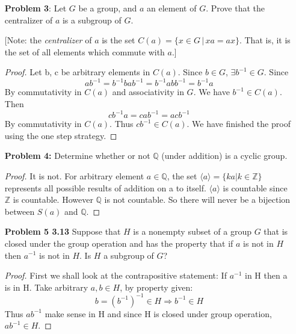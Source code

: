 \documentclass[11pt, oneside]{article}
\newcommand{\Z}{\mathbb Z}
\newcommand{\Q}{\mathbb Q}
\begin{document}
\begin{enumerate}
\begin{proof}
Notice that $a\neq e$ since if $a=e$ then $G = \{e, x\} \Rightarrow{} |G|=2$ which contradict our assumption.

Thus by doing binary operation $ax$, the result cannot fall back to $x$ since $a\neq e$ and identity is unique. 

Thus $ax = a^k \in \langle a \rangle$ for some $0 <k \leq n-1$. This implies $x=a^{k-1}\in \langle a \rangle. \Rightarrow\Leftarrow{}$ 
\end{proof}



\newpage
\item[{\bf Problem 3}:] Let $G$ be a group, and $a$ an element of $G$. Prove that the centralizer of $a$ is a subgroup of $G$. 

[Note: the {\it centralizer} of $a$ is the set $C(a) = \{x\in G\,|\, xa=ax\}$. That is, it is the set of all elements which commute with $a$.]
\begin{proof}
Let b, c be arbitrary elements in $C(a)$. 
Since $b \in G$, $\exists b^{-1}\in G$. Since \[ab^{-1}=b^{-1}bab^{-1} =b^{-1}abb^{-1}=b^{-1}a\]
By commutativity in $C(a)$ and associativity in $G$. We have $b^{-1}\in C(a)$. Then \[cb^{-1}a= cab^{-1}= acb^{-1}\]
By commutativity in $C(a)$. Thus $cb^{-1} \in C(a)$. We have finished the proof using the one step strategy. 
\end{proof}

\newpage

\item[{\bf Problem 4:}] Determine whether or not $\Q$ (under addition) is a cyclic group.
 \begin{proof}
 It is not. For arbitrary element $a\in \Q$, the set $\langle a \rangle=\{ka| k\in \Z\}$ represents all possible results of addition on a to itself. $\langle a \rangle$ is countable since $\Z$ is countable. However $\Q$ is not countable. So there will never be a bijection between $S(a)$ and $\Q$.
 \end{proof}

\newpage
\item[{\bf Problem 5 3.13}] Suppose that $H$ is a nonempty subset of a group $G$ that is closed under the group operation and has the property that if $a$ is not in $H$ then $a^{-1}$ is not in $H$.  Is $H$ a subgroup of $G$?

\begin{proof}
First we shall look at the contrapositive statement: If $a^{-1}$ in H then a is in H. Take arbitrary $a,b \in H$, by property given:
\[ b=(b^{-1})^{-1} \in H \Rightarrow{} b^{-1} \in H\]
Thus $ab^{-1}$ make sense in H and since H is closed under group operation, $ab^{-1}\in H$. 


\end{proof}
\end{enumerate}
\end{document}
